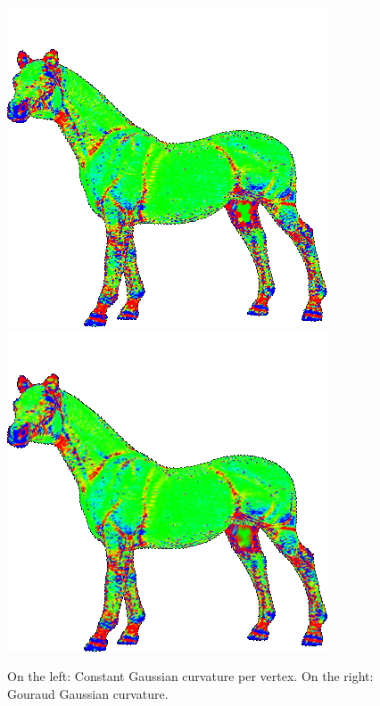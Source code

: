 \begin{figure}[!h]
    \endminipage\hfill
    \centering
    \includegraphics[scale=0.75]{images/gc-horse.png}
    \endminipage\hfill
    \centering
    \includegraphics[scale=0.75]{images/gci-horse.png}
    \endminipage
    \caption{On the left: Constant Gaussian curvature per vertex. On the right: Gouraud Gaussian curvature.}
    \label{fig:comparison-gc-gci}
\end{figure}

